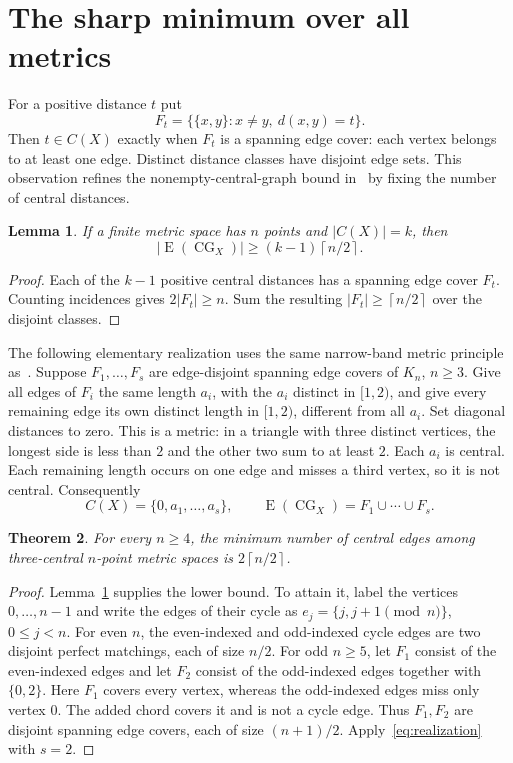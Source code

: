 \documentclass[11pt]{article}
\newtheorem{theorem}{Theorem}
\newtheorem{lemma}[theorem]{Lemma}
\newcommand{\CG}{\operatorname{CG}}
\newcommand{\E}{\operatorname{E}}
\newcommand{\ceil}[1]{\left\lceil #1\right\rceil}
\begin{document}
\section{The sharp minimum over all metrics}
For a positive distance $t$ put
\[
 F_t=\{\{x,y\}:x\ne y,\ d(x,y)=t\}.
\]
Then $t\in C(X)$ exactly when $F_t$ is a spanning edge cover: each
vertex belongs to at least one edge. Distinct distance classes have
disjoint edge sets. This observation refines the nonempty-central-graph
bound in~\cite[Theorem 3.10]{DR} by fixing the number of central
distances.

\begin{lemma}\label{lem:cover}
If a finite metric space has $n$ points and $|C(X)|=k$, then
\[
 |\E(\CG_X)|\ge (k-1)\ceil{n/2}.
\]
\end{lemma}
\begin{proof}
Each of the $k-1$ positive central distances has a spanning edge cover
$F_t$. Counting incidences gives $2|F_t|\ge n$. Sum the resulting
$|F_t|\ge\ceil{n/2}$ over the disjoint classes.
\end{proof}

The following elementary realization uses the same narrow-band metric
principle as~\cite[proof of Theorem 3.8, formula (19)]{DR}.
Suppose $F_1,\ldots,F_s$ are edge-disjoint spanning edge covers of
$K_n$, $n\ge3$. Give all edges of $F_i$ the same length $a_i$, with
the $a_i$ distinct in $[1,2)$, and give every remaining edge its own
distinct length in $[1,2)$, different from all $a_i$. Set diagonal
distances to zero. This is a metric: in a triangle with three distinct
vertices, the longest side is less than $2$ and the other two sum to
at least $2$. Each $a_i$ is central. Each remaining length occurs on
one edge and misses a third vertex, so it is not central. Consequently
\begin{equation}\label{eq:realization}
 C(X)=\{0,a_1,\ldots,a_s\},\qquad
 \E(\CG_X)=F_1\cup\cdots\cup F_s.
\end{equation}

\begin{theorem}\label{thm:metric}
For every $n\ge4$, the minimum number of central edges among
three-central $n$-point metric spaces is $2\ceil{n/2}$.
\end{theorem}
\begin{proof}
Lemma~\ref{lem:cover} supplies the lower bound. To attain it, label
the vertices $0,\ldots,n-1$ and write the edges of their cycle as
$e_j=\{j,j+1\pmod n\}$, $0\le j<n$.
For even $n$, the even-indexed and odd-indexed cycle edges are two
disjoint perfect matchings, each of size $n/2$.
For odd $n\ge5$, let $F_1$ consist of the even-indexed edges and
let $F_2$ consist of the odd-indexed edges together with $\{0,2\}$.
Here $F_1$ covers every vertex, whereas the odd-indexed edges miss
only vertex $0$. The added chord covers it and is not a cycle edge.
Thus $F_1,F_2$ are disjoint spanning edge covers, each of size
$(n+1)/2$. Apply~\eqref{eq:realization} with $s=2$.
\end{proof}
\end{document}
